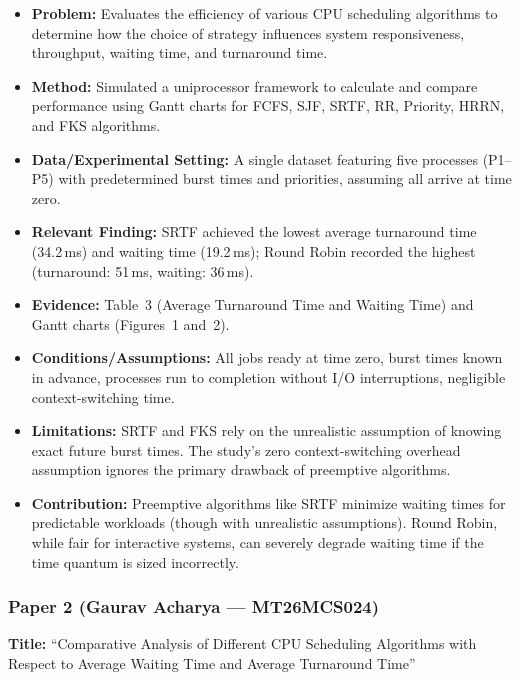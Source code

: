 \documentclass[11pt, a4paper]{article}
\begin{document}
\begin{itemize}[nosep]
    \item \textbf{Problem:} Evaluates the efficiency of various CPU scheduling algorithms to determine how the choice of strategy influences system responsiveness, throughput, waiting time, and turnaround time.
    \item \textbf{Method:} Simulated a uniprocessor framework to calculate and compare performance using Gantt charts for FCFS, SJF, SRTF, RR, Priority, HRRN, and FKS algorithms.
    \item \textbf{Data/Experimental Setting:} A single dataset featuring five processes (P1--P5) with predetermined burst times and priorities, assuming all arrive at time zero.
    \item \textbf{Relevant Finding:} SRTF achieved the lowest average turnaround time (34.2\,ms) and waiting time (19.2\,ms); Round Robin recorded the highest (turnaround: 51\,ms, waiting: 36\,ms).
    \item \textbf{Evidence:} Table~3 (Average Turnaround Time and Waiting Time) and Gantt charts (Figures~1 and~2).
    \item \textbf{Conditions/Assumptions:} All jobs ready at time zero, burst times known in advance, processes run to completion without I/O interruptions, negligible context-switching time.
    \item \textbf{Limitations:} SRTF and FKS rely on the unrealistic assumption of knowing exact future burst times. The study's zero context-switching overhead assumption ignores the primary drawback of preemptive algorithms.
    \item \textbf{Contribution:} Preemptive algorithms like SRTF minimize waiting times for predictable workloads (though with unrealistic assumptions). Round Robin, while fair for interactive systems, can severely degrade waiting time if the time quantum is sized incorrectly.
\end{itemize}

\subsubsection*{Paper 2 (Gaurav Acharya --- MT26MCS024)}
\textbf{Title:} ``Comparative Analysis of Different CPU Scheduling Algorithms with Respect to Average Waiting Time and Average Turnaround Time''
\end{document}
